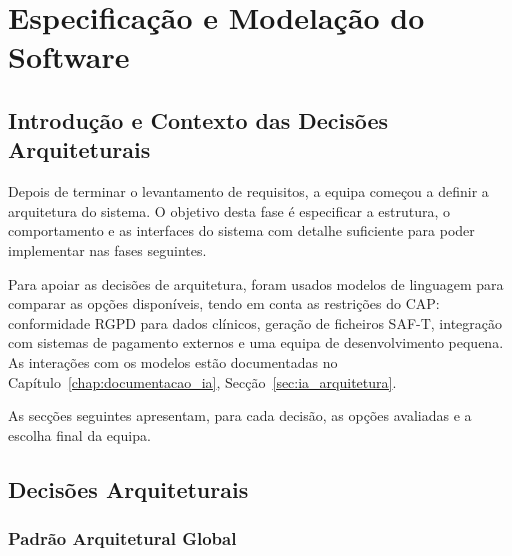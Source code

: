 
\chapter{Especificação e Modelação do Software}\label{chap:especificacao_modelacao}


\section{Introdução e Contexto das Decisões Arquiteturais}

Depois de terminar o levantamento de requisitos, a equipa começou a definir a arquitetura do sistema. O objetivo desta fase é especificar a estrutura, o comportamento e as interfaces do sistema com detalhe suficiente para poder implementar nas fases seguintes.

Para apoiar as decisões de arquitetura, foram usados modelos de linguagem para comparar as opções disponíveis, tendo em conta as restrições do CAP: conformidade RGPD para dados clínicos, geração de ficheiros SAF-T, integração com sistemas de pagamento externos e uma equipa de desenvolvimento pequena. As interações com os modelos estão documentadas no Capítulo~\ref{chap:documentacao_ia}, Secção~\ref{sec:ia_arquitetura}.

As secções seguintes apresentam, para cada decisão, as opções avaliadas e a escolha final da equipa.


\section{Decisões Arquiteturais}
\label{sec:decisoes_arq}
\label{sec:rel_decisoes_arq}

\subsection{Padrão Arquitetural Global}

